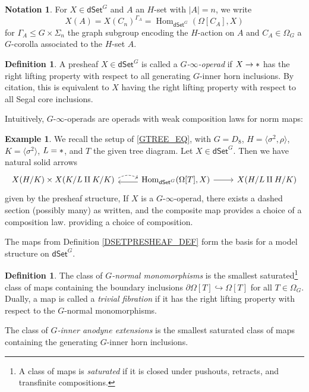 \documentclass[a4paper,10pt
,draft
]{article}%
\numberwithin{equation}{section}
\numberwithin{figure}{section}
\theoremstyle{definition} %
\newtheorem{definition}[equation]{Definition}%
\newtheorem{example}[equation]{Example}%
\newtheorem{notation}[equation]{Notation}%
\newcommand{\into}{\hookrightarrow}%
\newcommand{\dSet}{\mathsf{dSet}}
\DeclareMathOperator{\Hom}{Hom}%
\newcommand{\1}{\ensuremath{\mathbbm 1}}%
\begin{document}
\begin{notation}
      For $X \in \dSet^G$ and $A$ an $H$-set with $|A|=n$, we write
      \[
            X(A) = X(C_n)^{\Gamma_A} = \Hom_{\dSet^G}(\Omega[C_A],X)
      \]
      for $\Gamma_A \leq G \times \Sigma_n$ the graph subgroup encoding the $H$-action on $A$ and
      $C_A \in \Omega_G$ a $G$-corolla associated to the $H$-set $A$.
\end{notation}

\begin{definition}
      A presheaf $X \in \dSet^G$ is called a \textit{$G$-$\infty$-operad} if $X \to \**$ has the right lifting property with respect to all generating $G$-inner horn inclusions.
      By {\color{blue} citation}, this is equivalent to $X$ having the right lifting property with respect to all Segal core inclusions.
\end{definition}
Intuitively,
$G$-$\infty$-operads are operads with weak composition laws for norm maps:
\begin{example}
      We recall the setup of \eqref{GTREE_EQ}, with $G = D_8$, $H = \langle \sigma^2,\rho \rangle$, $K = \langle \sigma^2 \rangle$, $L = \**$, and $T$ the given tree diagram.
      Let $X \in \dSet^G$. Then we have natural solid arrows
      \[
            \begin{tikzcd}
                  X(H/K) \times X(K/L \amalg K/K) \arrow[r, start anchor = east, end anchor = west, dashed, bend left, shift left]
                  &
                  \Hom_{\dSet^G}(\Omega[T], X) \arrow[l, shift left] \arrow[r]
                  &
                  X(H/L \amalg H/K)
            \end{tikzcd}
      \]
      given by the presheaf structure,
      If $X$ is a $G$-$\infty$-operad, there exists a dashed section (possibly many) as written,
      and the composite map provides a choice of a composition law.
      providing a choice of composition.     
\end{example}





The maps from Definition \ref{DSETPRESHEAF_DEF} form the basis for a model structure on $\dSet^G$.

\begin{definition}
      The class of \textit{$G$-normal monomorphisms}
      is the smallest saturated\footnote{A class of maps is \textit{saturated} if it is closed under pushouts, retracts, and transfinite compositions.}
      class of maps containing the boundary inclusions $\partial \Omega[T] \into \Omega[T]$ for all $T \in \Omega_G$.
      Dually, a map is called a \textit{trivial fibration} if it has the right lifting property with respect to the $G$-normal monomorphisms.
      
      The class of \textit{$G$-inner anodyne extensions} is the smallest saturated class of maps containing the generating $G$-inner horn inclusions.
\end{definition}
\end{document}
